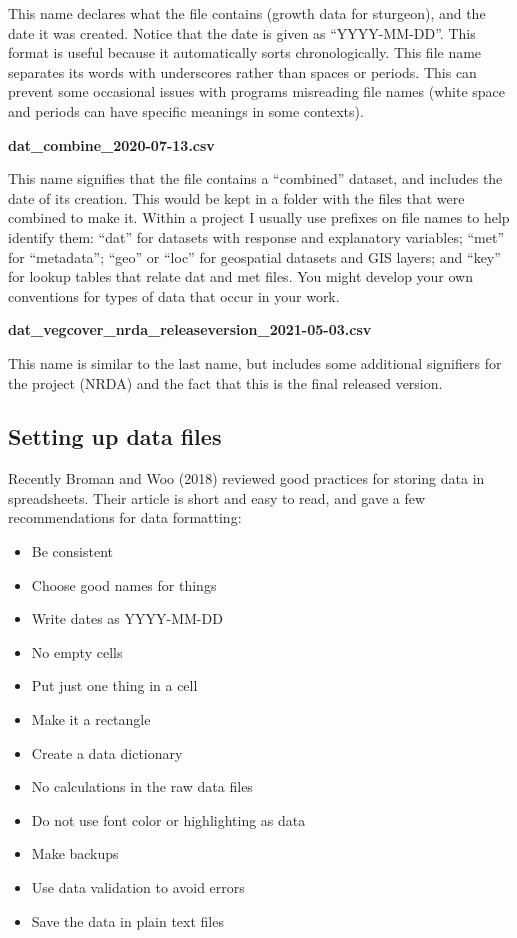 \documentclass[
  13,
  letterpaper,
]{report}
\begin{document}
This name declares what the file contains (growth data for sturgeon),
and the date it was created. Notice that the date is given as
``YYYY-MM-DD''. This format is useful because it automatically sorts
chronologically. This file name separates its words with underscores
rather than spaces or periods. This can prevent some occasional issues
with programs misreading file names (white space and periods can have
specific meanings in some contexts).

\textbf{dat\_combine\_2020-07-13.csv}

This name signifies that the file contains a ``combined'' dataset, and
includes the date of its creation. This would be kept in a folder with
the files that were combined to make it. Within a project I usually use
prefixes on file names to help identify them: ``dat'' for datasets with
response and explanatory variables; ``met'' for ``metadata''; ``geo'' or
``loc'' for geospatial datasets and GIS layers; and ``key'' for lookup
tables that relate dat and met files. You might develop your own
conventions for types of data that occur in your work.

\textbf{dat\_vegcover\_nrda\_releaseversion\_2021-05-03.csv}

This name is similar to the last name, but includes some additional
signifiers for the project (NRDA) and the fact that this is the final
released version.

\subsection{Setting up data files}\label{sec-04-format-set}

Recently Broman and Woo (2018) reviewed good practices for storing data
in spreadsheets. Their article is short and easy to read, and gave a few
recommendations for data formatting:

\begin{itemize}
\item
  Be consistent
\item
  Choose good names for things
\item
  Write dates as YYYY-MM-DD
\item
  No empty cells
\item
  Put just one thing in a cell
\item
  Make it a rectangle
\item
  Create a data dictionary
\item
  No calculations in the raw data files
\item
  Do not use font color or highlighting as data
\item
  Make backups
\item
  Use data validation to avoid errors
\item
  Save the data in plain text files
\end{itemize}
\end{document}
